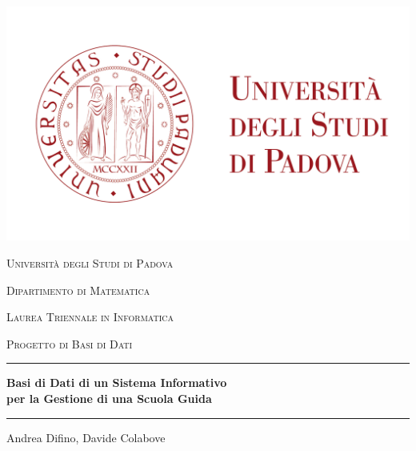 \documentclass[10pt,twoside]{article}
\begin{document}
\begin{titlepage}
    \centering
    \includegraphics{logo.png}\par\vspace{1cm}
    {\scshape\Large Università degli Studi di Padova \par}
    \vspace{1.5cm}
    {\scshape\large Dipartimento di Matematica\par}
    \vspace{0.5cm}
    {\scshape\large Laurea Triennale in Informatica\par}
    \vspace{2cm}
    {\scshape\Large Progetto di Basi di Dati\\\par}
    \vspace{1cm}
    \hrule
    \vspace{1cm}
    {\large\bfseries
    Basi di Dati di un Sistema Informativo\\
    per la Gestione di una Scuola Guida\par}
    \vspace{1cm}
    \hrule
    \vfill
    {\large Andrea Difino, Davide Colabove\par}
\end{titlepage}

\pagestyle{fancy}
\fancyhead{}

\tableofcontents

\newpage
\end{document}
